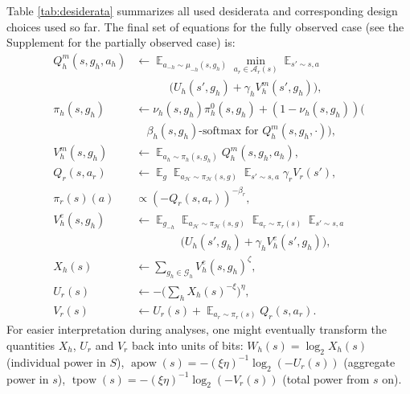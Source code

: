 \documentclass[letterpaper]{article} %
\DeclareMathOperator*{\E}{\mathbb{E}}
\DeclareMathOperator{\apow}{apow}
\DeclareMathOperator{\tpow}{tpow}
\def\A{\mathcal{A}}
\def\G{\mathcal{G}}
\def\H{\mathcal{H}}
\def\ld{\log_2}
\begin{document}
Table \ref{tab:desiderata} summarizes all used desiderata and corresponding design choices used so far.
The final set of equations for the fully observed case (see the Supplement for the partially observed case) is:
\begin{align}
    Q^m_h(s,g_h,a_h) &\gets \textstyle\E_{a_{-h}\sim\mu_{-h}(s,g_h)} \min_{a_r\in\A_r(s)} \E_{s'\sim s,a} \nonumber\\
        &\qquad\quad \big(U_h(s',g_h) + \gamma_h V^m_h(s',g_h)\big), \label{Qm} \\
    \pi_h(s,g_h) &\gets\nu_h(s,g_h)\pi^0_h(s,g_h) + (1-\nu_h(s,g_h))\big(\nonumber\\
        &\quad \text{$\beta_h(s,g_h)$-softmax for~} Q^m_h(s,g_h,\cdot)\big), \label{pih} \\ 
    V^m_h(s,g_h) &\gets \textstyle\E_{a_h\sim\pi_h(s,g_h)} Q^m_h(s,g_h,a_h), \label{Vm} \\
    Q_r(s,a_r) &\gets \textstyle \E_g\E_{a_\H\sim\pi_\H(s,g)} \E_{s'\sim s,a} \gamma_r V_r(s'), \label{Qr} \\
    \pi_r(s)(a) &\propto (-Q_r(s,a_r))^{-\beta_r}, \label{pir} \\
    V^e_h(s,g_h) &\gets \textstyle\E_{g_{-h}}\E_{a_{\H}\sim\pi_{\H}(s,g)} \E_{a_r\sim\pi_r(s)} \E_{s'\sim s,a}  \nonumber\\
        &\qquad\qquad \textstyle\big(U_h(s',g_h) + \gamma_h V^e_h(s',g_h)\big), \label{Ve} \\
    X_h(s) &\gets \textstyle \sum_{g_h\in\G_h} V^e_h(s,g_h)^\zeta, \label{Xh} \\
    U_r(s) &\gets \textstyle -\big(\sum_{h} X_h(s)^{-\xi}\big)^\eta, \label{Ur} \\
    V_r(s) &\gets \textstyle U_r(s) + \E_{a_r\sim\pi_r(s)} Q_r(s,a_r). \label{Vr}
\end{align}
For easier interpretation during analyses, one might eventually transform the quantities $X_h$, $U_r$ and $V_r$ back into units of bits: $W_h(s) = \ld X_h(s)$ (individual power in $S$), $\apow(s) = -(\xi\eta)^{-1}\ld(-U_r(s))$ (aggregate power in $s$), $\tpow(s) = -(\xi\eta)^{-1}\ld(-V_r(s))$ (total power from $s$ on).
\end{document}
